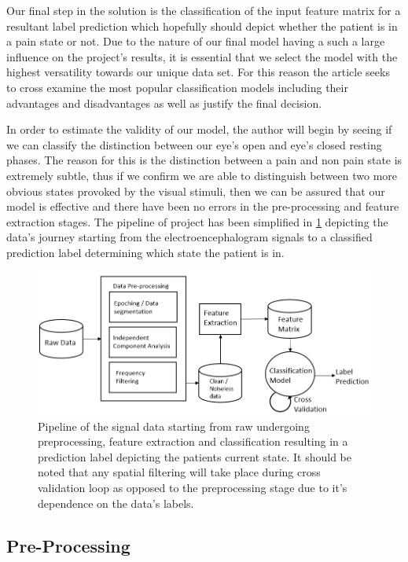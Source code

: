 \documentclass[12pt]{article}
\begin{document}
Our final step in the solution is the classification of the input feature matrix for a resultant label prediction which hopefully should depict whether the patient is in a pain state or not. Due to the nature of our final model having a such a large influence on the project's results, it is essential that we select the model with the highest versatility towards our unique data set. For this reason the article seeks to cross examine the most popular classification models including their advantages and disadvantages as well as justify the final decision. 

In order to estimate the validity of our model, the author will begin by seeing if we can classify the distinction between our eye's open and eye's closed resting phases. The reason for this is the distinction between a pain and non pain state is extremely subtle, thus if we confirm we are able to distinguish between two more obvious states provoked by the visual stimuli, then we can be assured that our model is effective and there have been no errors in the pre-processing and feature extraction stages. The pipeline of project has been simplified in \ref{fig:Pipeline} depicting the data's journey starting from the electroencephalogram signals to a classified prediction label determining which state the patient is in. 

\begin{figure}[tb]
\centering
\includegraphics[width=1\textwidth]{Pipeline.png}
\caption{\label{fig:Pipeline}Pipeline of the signal data starting from raw undergoing preprocessing, feature extraction and classification resulting in a prediction label depicting the patients current state. It should be noted that any spatial filtering will take place during cross validation loop as opposed to the preprocessing stage due to it's dependence on the data's labels.}
\end{figure} 

\subsection{Pre-Processing}
\end{document}
